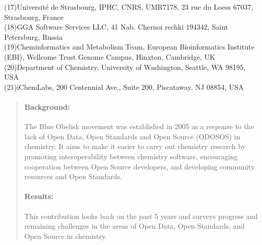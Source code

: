 \documentclass[10pt]{bmc_article}
\newenvironment{bmcformat}{\begin{raggedright}\baselineskip20pt\sloppy\setboolean{publ}{false}}{\end{raggedright}\baselineskip20pt\sloppy}
\begin{document}
\begin{bmcformat}
{    \iid(17)Universit\'{e} de Strasbourg, IPHC, CNRS, UMR7178, 23 rue du Loess 67037, Strasbourg, France \\
    \iid(18)GGA Software Services LLC, 41 Nab. Chernoi rechki 194342, Saint Petersburg, Russia \\
    \iid(19)Cheminformatics and Metabolism Team, European Bioinformatics Institute (EBI), Wellcome Trust Genome Campus, Hinxton, Cambridge, UK \\
    \iid(20)Department of Chemistry, University of Washington, Seattle, WA 98195, USA \\
    \iid(21)iChemLabs, 200 Centennial Ave., Suite 200, Piscataway, NJ 08854, USA 
}%

\maketitle



\begin{abstract}
        \paragraph*{Background:} The Blue Obelisk movement was established in 2005 as a
		response to the lack of Open Data, Open Standards and
		Open Source (ODOSOS) in chemistry. It aims to
make it easier to carry out chemistry research by
promoting interoperability between chemistry software, encouraging cooperation
between Open Source developers, and developing community resources and
Open Standards.

        \paragraph*{Results:} This
		contribution looks back on the past 5 years and surveys progress and
		remaining challenges in the areas of Open Data, Open Standards, and
    Open Source in chemistry.


\end{abstract}
\end{bmcformat}
\end{document}
